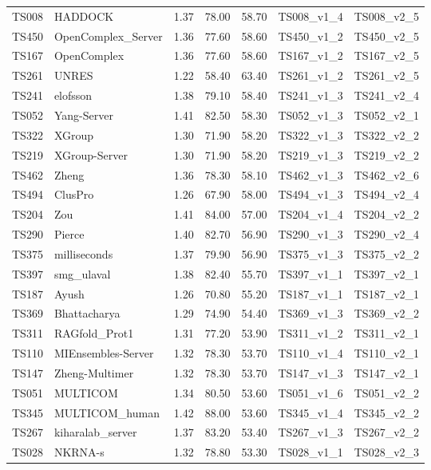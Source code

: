 \begin{longtable}{lllllll}
TS008 & HADDOCK & 1.37 & 78.00 & 58.70 & TS008\_v1\_4 & TS008\_v2\_5 \\ 
TS450 & OpenComplex\_Server & 1.36 & 77.60 & 58.60 & TS450\_v1\_2 & TS450\_v2\_5 \\ 
TS167 & OpenComplex & 1.36 & 77.60 & 58.60 & TS167\_v1\_2 & TS167\_v2\_5 \\ 
TS261 & UNRES & 1.22 & 58.40 & 63.40 & TS261\_v1\_2 & TS261\_v2\_5 \\ 
TS241 & elofsson & 1.38 & 79.10 & 58.40 & TS241\_v1\_3 & TS241\_v2\_4 \\ 
TS052 & Yang-Server & 1.41 & 82.50 & 58.30 & TS052\_v1\_3 & TS052\_v2\_1 \\ 
TS322 & XGroup & 1.30 & 71.90 & 58.20 & TS322\_v1\_3 & TS322\_v2\_2 \\ 
TS219 & XGroup-Server & 1.30 & 71.90 & 58.20 & TS219\_v1\_3 & TS219\_v2\_2 \\ 
TS462 & Zheng & 1.36 & 78.30 & 58.10 & TS462\_v1\_3 & TS462\_v2\_6 \\ 
TS494 & ClusPro & 1.26 & 67.90 & 58.00 & TS494\_v1\_3 & TS494\_v2\_4 \\ 
TS204 & Zou & 1.41 & 84.00 & 57.00 & TS204\_v1\_4 & TS204\_v2\_2 \\ 
TS290 & Pierce & 1.40 & 82.70 & 56.90 & TS290\_v1\_3 & TS290\_v2\_4 \\ 
TS375 & milliseconds & 1.37 & 79.90 & 56.90 & TS375\_v1\_3 & TS375\_v2\_2 \\ 
TS397 & smg\_ulaval & 1.38 & 82.40 & 55.70 & TS397\_v1\_1 & TS397\_v2\_1 \\ 
TS187 & Ayush & 1.26 & 70.80 & 55.20 & TS187\_v1\_1 & TS187\_v2\_1 \\ 
TS369 & Bhattacharya & 1.29 & 74.90 & 54.40 & TS369\_v1\_3 & TS369\_v2\_2 \\ 
TS311 & RAGfold\_Prot1 & 1.31 & 77.20 & 53.90 & TS311\_v1\_2 & TS311\_v2\_1 \\ 
TS110 & MIEnsembles-Server & 1.32 & 78.30 & 53.70 & TS110\_v1\_4 & TS110\_v2\_1 \\ 
TS147 & Zheng-Multimer & 1.32 & 78.30 & 53.70 & TS147\_v1\_3 & TS147\_v2\_1 \\ 
TS051 & MULTICOM & 1.34 & 80.50 & 53.60 & TS051\_v1\_6 & TS051\_v2\_2 \\ 
TS345 & MULTICOM\_human & 1.42 & 88.00 & 53.60 & TS345\_v1\_4 & TS345\_v2\_2 \\ 
TS267 & kiharalab\_server & 1.37 & 83.20 & 53.40 & TS267\_v1\_3 & TS267\_v2\_2 \\ 
TS028 & NKRNA-s & 1.32 & 78.80 & 53.30 & TS028\_v1\_1 & TS028\_v2\_3 \\ 

\end{longtable}

